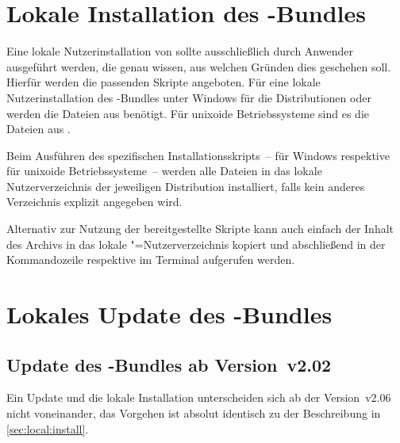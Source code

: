 \section{Lokale Installation des \TUDScript-Bundles}
%
%
%
Eine lokale Nutzerinstallation von \TUDScript sollte ausschließlich durch 
Anwender ausgeführt werden, die genau wissen, aus welchen Gründen dies 
geschehen soll. Hierfür werden die passenden Skripte angeboten. Für eine lokale 
Nutzerinstallation des \TUDScript-Bundles unter Windows für die Distributionen 
 oder  werden die 
Dateien aus
%
{}
benötigt. Für unixoide Betriebssysteme sind es die Dateien aus 
%
{}.

Beim Ausführen des spezifischen Installationsskripts~-- 
 für Windows respektive 
 für unixoide Betriebssysteme~-- werden 
alle Dateien in das lokale Nutzerverzeichnis der jeweiligen Distribution 
installiert, falls kein anderes Verzeichnis explizit angegeben wird. 

Alternativ zur Nutzung der bereitgestellte Skripte kann auch einfach der Inhalt 
des Archivs
%
{}
in das lokale "=Nutzerverzeichnis kopiert und abschließend in der 
Kommandozeile respektive im Terminal  aufgerufen werden. 



\section{Lokales Update des \TUDScript-Bundles}
%
%
%
\subsection{Update des \TUDScript-Bundles ab Version~v2.02}
Ein Update und die lokale Installation unterscheiden sich ab der Version~v2.06 
nicht voneinander, das Vorgehen ist absolut identisch zu der Beschreibung in 
\autoref{sec:local:install}.

